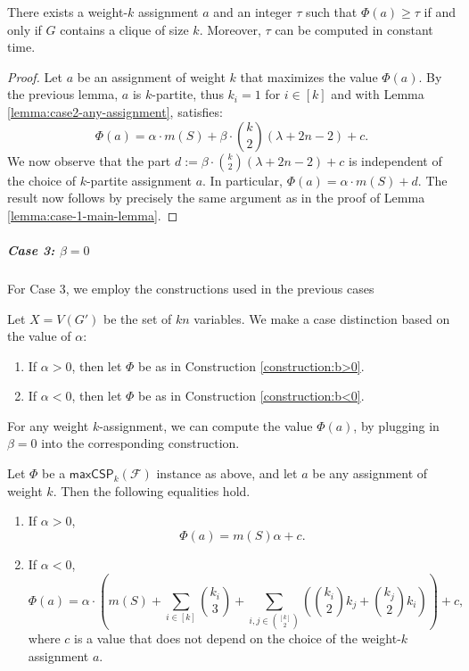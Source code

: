 \documentclass[a4paper,UKenglish,cleveref, autoref, thm-restate,numberwithinsect]{lipics-v2021}
\newcommand{\maxcspk}{\textsf{maxCSP}_{k}}
\newcommand{\Fam}{\mathcal{F}}
\begin{document}
\begin{lemma}\label{lemma:case-2-main-lemma}
    There exists a weight-$k$ assignment $a$ and an integer $\tau$ such that $\Phi(a)\geq \tau$ if and only if $G$ contains a clique of size $k$. Moreover, $\tau$ can be computed in constant time.
\end{lemma}
\begin{proof}
    Let $a$ be an assignment of weight $k$ that maximizes the value $\Phi(a)$. By the previous lemma, $a$ is $k$-partite, thus $k_i=1$ for $i \in [k]$ and with Lemma \ref{lemma:case2-any-assignment}, satisfies:
    \[
    \Phi(a) = \alpha \cdot m(S)  
    + \beta \cdot\binom{k}{2} (\lambda + 2n-2)
    + c.
    \]
    We now observe that the part $d:= \beta \cdot\binom{k}{2} (\lambda + 2n-2)
    + c$ is independent of the choice of $k$-partite assignment $a$.
    In particular, $\Phi(a) = \alpha \cdot m(S) + d$. 
    The result now follows by precisely the same argument as in the proof of Lemma \ref{lemma:case-1-main-lemma}.
\end{proof}
\subparagraph*{{Case 3: $\beta=0$}} 
For Case 3, we employ the constructions used in the previous cases
\begin{construction}\label{construction:b=0}
    Let $X = V(G')$ be the set of $kn$ variables.
    We make a case distinction based on the value of $\alpha$:
    \begin{enumerate}
        \item If $\alpha>0$, then let $\Phi$ be as in Construction \ref{construction:b>0}.
        \item If $\alpha<0$, then let $\Phi$ be as in Construction \ref{construction:b<0}.
    \end{enumerate}
\end{construction}
\medskip
For any weight $k$-assignment, we can compute the value $\Phi(a)$, by plugging in $\beta=0$ into the corresponding construction.
\begin{lemma}
    Let $\Phi$ be a $\maxcspk(\Fam)$ instance as above, and let $a$ be any assignment of weight $k$. 
    Then the following equalities hold.
    \begin{enumerate}
        \item If $\alpha>0$, 
        \[
            \Phi(a) = m(S)\alpha + c  .   
        \]
        \item  If $\alpha<0$,
        \[
        \Phi(a) = \alpha\cdot \left(m(S) + \sum_{i\in [k]}\binom{k_i}{3} + \sum_{i,j\in\binom{[k]}{2}}\left(\binom{k_i}{2}k_j + \binom{k_j}{2}k_i\right)\right) +  c,
        \]
        where $c$ is a value that does not depend on the choice of the weight-$k$ assignment $a$.
    \end{enumerate}
\end{lemma}
\end{document}
